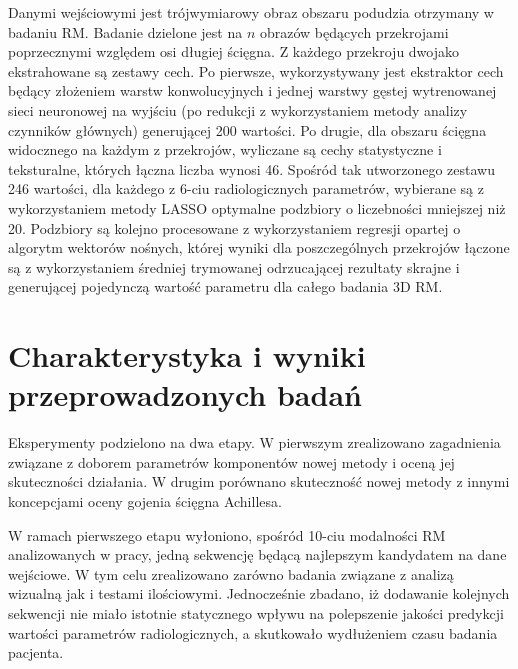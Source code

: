 Danymi wejściowymi jest trójwymiarowy obraz obszaru podudzia otrzymany w badaniu RM. Badanie dzielone jest na $n$ obrazów będących przekrojami poprzecznymi względem osi długiej ścięgna. Z każdego przekroju dwojako ekstrahowane są zestawy cech. Po pierwsze, wykorzystywany jest ekstraktor cech będący złożeniem warstw konwolucyjnych i jednej warstwy gęstej wytrenowanej sieci neuronowej na wyjściu (po redukcji z wykorzystaniem metody analizy czynników głównych) generującej 200 wartości. Po drugie, dla obszaru ścięgna widocznego na każdym z przekrojów, wyliczane są cechy statystyczne i teksturalne, których łączna liczba wynosi 46. Spośród tak utworzonego zestawu 246 wartości, dla każdego z 6-ciu radiologicznych parametrów, wybierane są z wykorzystaniem metody LASSO optymalne podzbiory o liczebności mniejszej niż 20. Podzbiory są kolejno procesowane z wykorzystaniem regresji opartej o algorytm wektorów nośnych, której wyniki dla poszczególnych przekrojów łączone są z wykorzystaniem średniej trymowanej odrzucającej rezultaty skrajne i generującej pojedynczą wartość parametru dla całego badania 3D RM.   


{\let\clearpage\relax\chapter*{Charakterystyka i wyniki przeprowadzonych badań}}

Eksperymenty podzielono na dwa etapy. W pierwszym zrealizowano zagadnienia związane z doborem parametrów komponentów nowej metody i oceną jej skuteczności działania. W drugim porównano skuteczność nowej metody z innymi koncepcjami oceny gojenia ścięgna Achillesa. 

W ramach pierwszego etapu wyłoniono, spośród 10-ciu modalności RM analizowanych w pracy, jedną sekwencję będącą najlepszym kandydatem na dane wejściowe. W tym celu zrealizowano zarówno badania związane z analizą wizualną jak i testami ilościowymi. Jednocześnie zbadano, iż dodawanie kolejnych sekwencji nie miało istotnie statycznego wpływu na polepszenie jakości predykcji wartości parametrów radiologicznych, a skutkowało wydłużeniem czasu badania pacjenta. 

